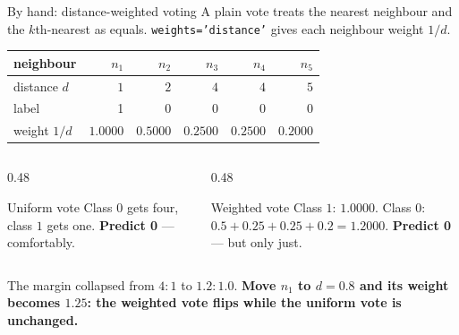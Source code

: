 \documentclass[aspectratio=169]{beamer}
\begin{document}
\begin{frame}[shrink=8]{By hand: distance-weighted voting}
A plain vote treats the nearest neighbour and the $k$th-nearest as equals.
\texttt{weights='distance'} gives each neighbour weight $1/d$.
\begin{center}\small
\begin{tabular}{@{}lrrrrr@{}}
  \toprule
  neighbour & $n_1$ & $n_2$ & $n_3$ & $n_4$ & $n_5$\\
  \midrule
  distance $d$ & $1$ & $2$ & $4$ & $4$ & $5$\\
  label & 1 & 0 & 0 & 0 & 0\\
  weight $1/d$ & $1.0000$ & $0.5000$ & $0.2500$ & $0.2500$ & $0.2000$\\
  \bottomrule
\end{tabular}
\end{center}
\begin{columns}[T]
  \begin{column}{0.48\textwidth}
    \begin{block}{Uniform vote}
      \small Class $0$ gets four, class $1$ gets one. \textbf{Predict 0} ---
      comfortably.
    \end{block}
  \end{column}
  \begin{column}{0.48\textwidth}
    \begin{block}{Weighted vote}
      \small Class $1$: $1.0000$. Class $0$: $0.5 + 0.25 + 0.25 + 0.2 =
      1.2000$. \textbf{Predict 0} --- but only just.
    \end{block}
  \end{column}
\end{columns}
\begin{center}\small
  The margin collapsed from $4{:}1$ to $1.2{:}1.0$. \textbf{Move $n_1$ to
  $d = 0.8$ and its weight becomes $1.25$: the weighted vote flips while the
  uniform vote is unchanged.}
\end{center}
\end{frame}
\end{document}
